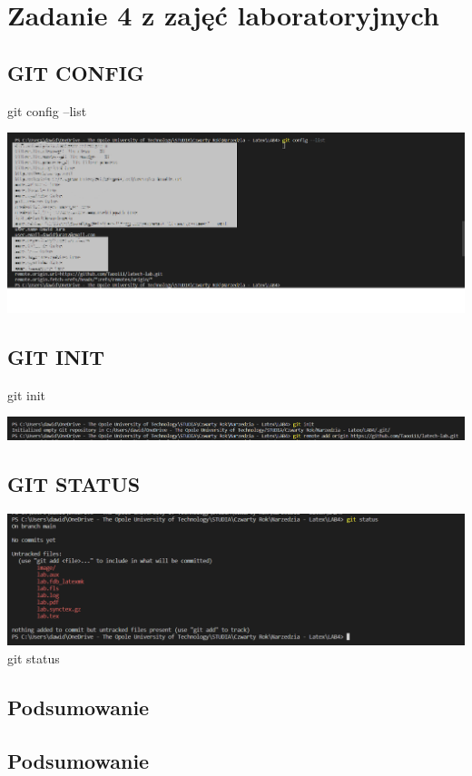 \documentclass{article} %
\newcommand{\forceindent}{\leavevmode{\parindent=1cm\indent}} %
\begin{document}
\section{Zadanie 4 z zajęć laboratoryjnych}
\subsection{GIT CONFIG}
\forceindent git config --list

\includegraphics[width=18cm]{image/config.png}
\subsection{GIT INIT}
\forceindent git init

\includegraphics[width=18cm]{image/init.png}
\subsection{GIT STATUS}

\includegraphics[width=18cm]{image/status.png}
\forceindent git status
\subsection{Podsumowanie}
\forceindent

\subsection{Podsumowanie}
\forceindent
\end{document}
